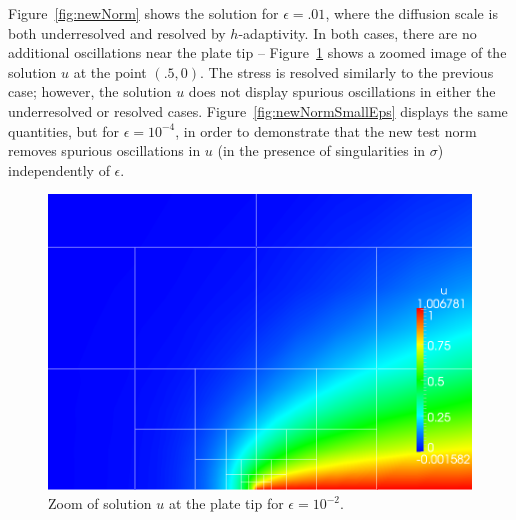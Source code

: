 Figure~\ref{fig:newNorm} shows the solution for $\epsilon = .01$, where the diffusion scale is both underresolved and resolved by $h$-adaptivity.  In both cases, there are no additional oscillations near the plate tip -- Figure~\ref{fig:newNormZoom} shows a zoomed image of the solution $u$ at the point $(.5,0)$.  The stress is resolved similarly to the previous case; however, the solution $u$ does not display spurious oscillations in either the underresolved or resolved cases.  Figure~\ref{fig:newNormSmallEps} displays the same quantities, but for $\epsilon = 10^{-4}$, in order to demonstrate that the new test norm removes spurious oscillations in $u$ (in the presence of singularities in $\sigma$) independently of $\epsilon$.  

\begin{figure}[!h]
\centering
\includegraphics[scale=.3]{figs/LaplaceFigs/coupled1e2h1e3uZoom.png}
\caption{Zoom of solution $u$ at the plate tip for $\epsilon = 10^{-2}$.}
\label{fig:newNormZoom}
\end{figure}

